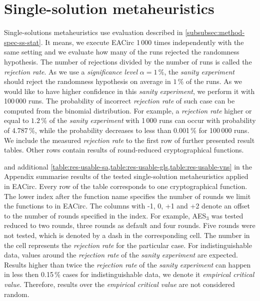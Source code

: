 \documentclass[
    digital,    %
    oneside,    %
    color,
    11pt,
    nocover,
    notable,
    nolof,
    nolot,
]{fithesis3}
\begin{document}
\section{Single-solution metaheuristics}
\label{sec:res-ss}

Single-solutions metaheuristics use evaluation described in \cref{subsubsec:method-spec-ss-stat}. It means, we execute EACirc 1\,000 times independently with the same setting and we evaluate how many of the runs rejected the randomness hypothesis. The number of rejections divided by the number of runs is called the \textit{rejection rate}. As we use a \textit{significance level} $\alpha=1\,\%$, the \textit{sanity experiment} should reject the randomness hypothesis on average in $1\,\%$ of the runs. As we would like to have higher confidence in this \textit{sanity experiment}, we perform it with 100\,000 runs. The probability of incorrect \textit{rejection rate} of such case can be computed from the binomial distribution. For example, a \textit{rejection rate} higher or equal to $1.2\,\%$ of the \textit{sanity experiment} with 1\,000 runs can occur with probability of 4.787\,\%, while the probability decreases to less than 0.001\,\% for 100\,000 runs. We include the measured \textit{rejection rate} to the first row of further presented result tables. Other rows contain results of round-reduced cryptographical functions.

 and additional \cref{table:res-usable-sa,table:res-usable-gls,table:res-usable-vns} in the Appendix summarise results of the tested single-solution metaheuristics applied in EACirc. Every row of the table corresponds to one cryptographical function. The lower index after the function name specifies the number of rounds we limit the functions to in EACirc. The columns with -1, 0, +1 and +2 denote an offset to the number of rounds specified in the index. For example, AES$_{3}$ was tested reduced to two rounds, three rounds as default and four rounds. Five rounds were not tested, which is denoted by a dash in the corresponding cell. The number in the cell represents the \textit{rejection rate} for the particular case. For indistinguishable data, values around the \textit{rejection rate} of the \textit{sanity experiment} are expected. Results higher than twice the \textit{rejection rate} of the \textit{sanity experiment} can happen in less then 0.15\,\% cases for indistinguishable data, we denote it \textit{empirical critical value}. Therefore, results over the \textit{empirical critical value} are not considered random.
\end{document}
